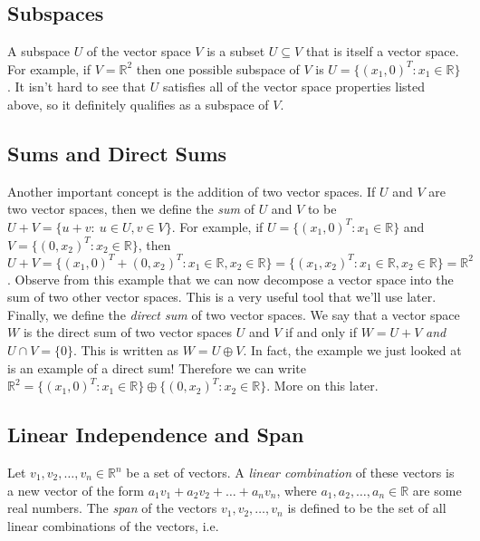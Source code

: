 \documentclass[12pt]{article}
\begin{document}
\subsection*{Subspaces}

A subspace $U$ of the vector space $V$ is a subset $U \subseteq V$ that is itself a vector space. For example, if $V = \mathbb{R}^2$ then one possible subspace of $V$ is $U = \{ (x_1, 0)^T : x_1 \in \mathbb{R} \}$. It isn't hard to see that $U$ satisfies all of the vector space properties listed above, so it definitely qualifies as a subspace of $V$. 

\subsection*{Sums and Direct Sums}

Another important concept is the addition of two vector spaces. If $U$ and $V$ are two vector spaces, then we define the \textit{sum} of $U$ and $V$ to be $U + V = \{ u + v : \: u \in U, v \in V \}$. For example, if $U = \{ (x_1, 0)^T : x_1 \in \mathbb{R} \}$ and $V = \{ (0, x_2)^T : x_2 \in \mathbb{R} \}$, then $U + V = \{ (x_1, 0)^T + (0, x_2)^T : x_1 \in \mathbb{R}, x_2 \in \mathbb{R} \} = \{ (x_1, x_2)^T : x_1 \in \mathbb{R}, x_2 \in \mathbb{R} \} = \mathbb{R}^2$. Observe from this example that we can now decompose a vector space into the sum of two other vector spaces. This is a very useful tool that we'll use later. Finally, we define the \textit{direct sum} of two vector spaces. We say that a vector space $W$ is the direct sum of two vector spaces $U$ and $V$ if and only if $W = U + V$ \textit{and} $U \cap V = \{0\}$. This is written as $W = U \oplus V$. In fact, the example we just looked at is an example of a direct sum! Therefore we can write $\mathbb{R}^2 = \{ (x_1, 0)^T : x_1 \in \mathbb{R} \} \oplus \{ (0, x_2)^T : x_2 \in \mathbb{R} \}$. More on this later.

\subsection*{Linear Independence and Span}

Let $v_1, v_2, \ldots, v_n \in \mathbb{R}^n$ be a set of vectors. A \textit{linear combination} of these vectors is a new vector of the form $a_1 v_1 + a_2 v_2 + \ldots + a_n v_n$, where $a_1, a_2, \ldots, a_n \in \mathbb{R}$ are some real numbers. The \textit{span} of the vectors $v_1, v_2, \ldots, v_n $ is defined to be the set of all linear combinations of the vectors, i.e.
\end{document}
